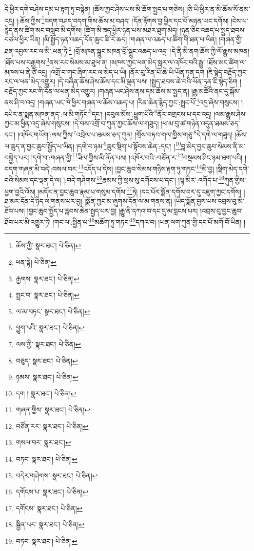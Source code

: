དེ་ཕྱིར་དགེ་བཤེས་དམ་པ་རྟག་ཏུ་བསྟེན། །ཆོས་ཀྱང་ཤེས་པས་མི་ཆོག་སྤྱད་པ་གཅེས། །ཅི་ཡི་ཕྱིར་ན་མི་ཆོས་སོ་ནམ་འདྲ། །:ཆོས་ཀྱིས་\footnote{ཆོས་ཀྱི་  སྣར་ཐང་།  པེ་ཅིན། }བདག་བཤད་བདག་གིས་ཆོས་མ་བཤད། །དོན་རྟོགས་བྱ་ཕྱིར་དང་པོ་མཉན་ཡང་དགོས། །ངེས་པ་རྙེད་ནས་ཚིག་མང་བསླབ་མི་དགོས། །ཚིག་མི་ཟད་ཕྱིར་ཉན་པས་མཐར་ཐུག་མེད། །ཉན་ཅིང་འཆད་པ་སྤྱད་ཐབས་བཙལ་ཕྱིར་ཡིན། །མི་སྤྱོད་ཉན་འཆད་དོན་ཆུང་ཚི་རེ་ཆད། །གཞན་ལ་འཆད་པ་ཚིག་གི་ཐན་པ་ཡིན། །གཞན་གྱི་ཐན་འབྱལ་རང་ལ་མི་:ཕན་ཏེ།\footnote{ཕན་སྟེ།  པེ་ཅིན། } །བྲོ་མཁན་སྒྲུང་མཁན་བྲོ་སྒྲུང་འཆད་པ་འདྲ། །དེ་ནི་མི་ནག་ཆོས་ཀྱི་ལོ་རྒྱུས་མཁན། །ཐོས་པས་བརྒྱགས་\footnote{རྒྱགས་  སྣར་ཐང་།  པེ་ཅིན། }ནས་རང་སེམས་མ་ཐུལ་ན། །མཁས་ཀྱང་ཕན་མེད་སླར་ལ་འཁོར་བའི་རྒྱུ། །ཐོས་མང་ཚིག་ལ་མཁས་པ་ནེ་ཙོ་འདྲ། །འགྲོ་བ་གང་ཞིག་རང་ལ་མེད་པ་ཡི། །ནོར་བུ་རིན་པོ་ཆེ་ཡི་ཡོན་ཏན་དག །ཇི་སྙེད་བརྗོད་ཀྱང་རང་ལ་ཕན་མེད་འགྱུར། །དེ་བཞིན་ཆོས་ཤེས་ཆོས་དང་མི་ལྡན་པས། །སྤྱད་ཐབས་ཆེ་བའི་ཡོན་ཏན་ཇི་སྙེད་ཅིག །བརྗོད་ཀྱང་རང་གི་དོན་ལ་ཕན་མེད་འགྱུར། །གཞན་ཡང་ཤེས་ནས་དམ་ཆོས་མ་སྤྱད་ན། །རྒྱ་མཚོའི་ནང་དུ་སྐོམ་ནས་ཤི་བ་འདྲ། །གཞན་ཡང་ཁེ་ཕྱིར་གཞན་ལ་ཆོས་འཆད་པ། །རིན་ཆེན་རྙེད་ཀྱང་:སྤྲང་པོ་\footnote{སྤྲང་བ་  སྣར་ཐང་།  པེ་ཅིན། }འདྲ་ཞེས་གསུངས། །དཔེར་ན་སྨན་མཁན་ནད་:ལ་མི་གཏོང་\footnote{ལ་མ་བཏང་  སྣར་ཐང་།  པེ་ཅིན། }དང་། །དབུལ་མོས་:ཕྱུག་པོའི་\footnote{ཕྱུག་པའི་  སྣར་ཐང་།  པེ་ཅིན། }ནོར་བགྲངས་པ་དང་འདྲ། །ལམ་རྒྱུས་ཤེས་ཀྱང་མ་ཕྱིན་འདྲ་ཞེས་གསུངས། །དེ་བས་འགྲོ་བ་ཀུན་ཀྱང་ཆོས་ལ་གཟུད། །ཕ་མ་བུ་ཚ་གཉེན་འདུན་ཐམས་ཅད་དང་། །འཁོར་གཡོག་:ལས་ཀྱིས་\footnote{ལས་ཀྱི་  སྣར་ཐང་།  པེ་ཅིན། }འབྲེལ་པ་ཐམས་ཅད་ཀུན། །གྲོས་བཏབ་གལ་གྱིས་གཅུ་\footnote{བཅུད་  སྣར་ཐང་།  པེ་ཅིན། }དེ་དགེ་ལ་གཟུད། །ཆོས་ལ་ཆུད་ན་བྱང་ཆུབ་སྤྱོད་པ་ཡིན། །དགེ་བ་ཉམ་\footnote{ཉམས་  སྣར་ཐང་།  པེ་ཅིན། }ཆུང་སྡིག་པ་སྟོབས་ཆེན་:དང་། །\footnote{དག །  སྣར་ཐང་།  པེ་ཅིན། }བླ་མེད་བྱང་ཆུབ་སེམས་ནི་མ་བསྐྱེད་པར། །དགེ་བ་:གཞན་གྱི་\footnote{གཞན་གྱིས་  སྣར་ཐང་།  པེ་ཅིན། }ཟིལ་གྱིས་མི་ནོན་པས། །འཁོར་བའི་:བཙོན་ར་\footnote{བཙོན་རར་  སྣར་ཐང་།  པེ་ཅིན། }བསྡམས་ཤིང་ཉམ་ཐག་པའི། །བདག་གཞན་མི་བདེ་:བསལ་བར་\footnote{གསལ་བར་  སྣར་ཐང་། }འདོད་པ་དེས། །བྱང་ཆུབ་སེམས་གཉིས་རྟག་ཏུ་གཏང་\footnote{བཏང་  སྣར་ཐང་།  པེ་ཅིན། }མི་བྱ། །སྡིག་མེད་དགེ་བའི་སེམས་དང་ལྡན་དེ་ལ། །:བདེ་གཤེགས་\footnote{བདེར་གཤེགས་  སྣར་ཐང་།  པེ་ཅིན། }རྣམས་ཀྱི་སྲས་སུ་དགོངས་པ་དང་། །ལྷ་མིར་:འགོད་པ་\footnote{དགོངས་པ་  སྣར་ཐང་།  པེ་ཅིན། }ཀུན་གྱིས་ཕྱག་བྱའི་འོས། །མདོར་ན་བྱང་ཆུབ་རྣམ་པ་གསུམ་དགོས་\footnote{དགོངས་  སྣར་ཐང་།  པེ་ཅིན། }ཏེ། །དང་པོར་སྨོན་དགོས་བར་དུ་འཇུག་ཀྱང་དགོས། །ཐ་མར་དོན་དེ་ཉིད་ལ་གནས་པར་བྱ། །སྨོན་ཀྱང་མ་ཞུགས་དོན་ལ་མ་གནས་ན། །ཡིད་སྨོན་བྱས་པས་འབྲས་བུ་མི་ཐོབ་པས། །བྱང་ཆུབ་སྤྱོད་པ་རླབས་ཆེན་སྤྱད་པར་བྱ། །རྒྱུ་ནི་དཀའ་བ་དང་དུ་མ་བླངས་པར། །འབྲས་བུ་བྱང་ཆུབ་ཐོབ་པར་མི་འགྱུར་ཏེ། །གང་ལ་:སྦྱིན་པ་\footnote{སྦྱིན་པར་  སྣར་ཐང་།  པེ་ཅིན། }མཆོག་ཏུ་གཏང་\footnote{བཏང་  སྣར་ཐང་།  པེ་ཅིན། }དཀའ་བ། །ཡན་ལག་ཀུན་གྱི་དང་པོ་མགོ་བོ་ཡིན། །
